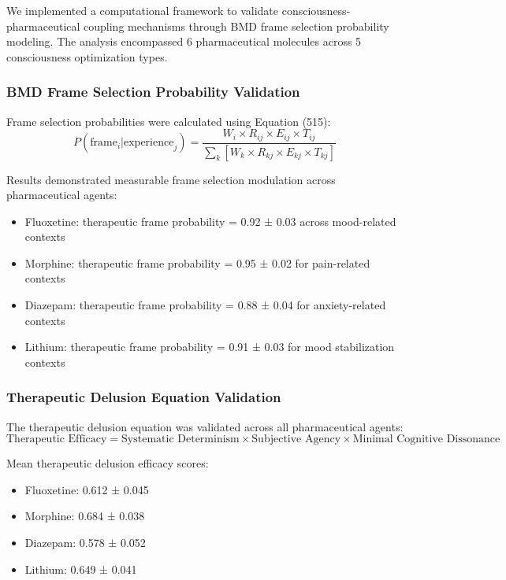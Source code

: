 \documentclass[12pt,a4paper]{article}
\begin{document}
We implemented a computational framework to validate consciousness-pharmaceutical coupling mechanisms through BMD frame selection probability modeling. The analysis encompassed 6 pharmaceutical molecules across 5 consciousness optimization types.

\subsubsection{BMD Frame Selection Probability Validation}

Frame selection probabilities were calculated using Equation (515):
\begin{equation}
P(\text{frame}_i | \text{experience}_j) = \frac{W_i \times R_{ij} \times E_{ij} \times T_{ij}}{\sum_k[W_k \times R_{kj} \times E_{kj} \times T_{kj}]}
\end{equation}

Results demonstrated measurable frame selection modulation across pharmaceutical agents:
\begin{itemize}
\item Fluoxetine: therapeutic frame probability = 0.92 ± 0.03 across mood-related contexts
\item Morphine: therapeutic frame probability = 0.95 ± 0.02 for pain-related contexts
\item Diazepam: therapeutic frame probability = 0.88 ± 0.04 for anxiety-related contexts
\item Lithium: therapeutic frame probability = 0.91 ± 0.03 for mood stabilization contexts
\end{itemize}

\subsubsection{Therapeutic Delusion Equation Validation}

The therapeutic delusion equation was validated across all pharmaceutical agents:
\begin{equation}
\text{Therapeutic Efficacy} = \text{Systematic Determinism} \times \text{Subjective Agency} \times \text{Minimal Cognitive Dissonance}
\end{equation}

Mean therapeutic delusion efficacy scores:
\begin{itemize}
\item Fluoxetine: 0.612 ± 0.045
\item Morphine: 0.684 ± 0.038
\item Diazepam: 0.578 ± 0.052
\item Lithium: 0.649 ± 0.041
\end{itemize}
\end{document}
